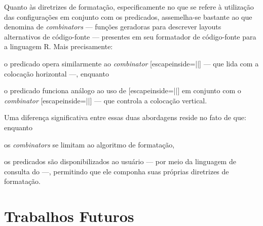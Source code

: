 \documentclass
  [11pt,a4paper,english,brazil,openright,sumario=tradicional,twoside]
  {abntex2}
\begin{document}
  Quanto às diretrizes de formatação, especificamente no que se refere à
  utilização das configurações em conjunto com os predicados, assemelha-se
  bastante ao que \textcite{yelland-2015-new} denomina de \textit{combinators}
  --- funções geradoras para descrever layouts alternativos de código-fonte ---
  presentes em seu formatador de código-fonte para a linguagem R. Mais
  precisamente:
  \begin{inparaenum}
    \item o predicado  opera similarmente ao
          \textit{combinator}
          \codesnippetinline{|$\leftrightarrow$|}[escapeinside=||] --- que lida
          com a colocação horizontal ---, enquanto
    \item o predicado  funciona análogo ao uso de
          \codesnippetinline{|$\leftrightarrow$|}[escapeinside=||] em conjunto
          com o \textit{combinator}
          \codesnippetinline{|$\updownarrow$|}[escapeinside=||] --- que
          controla a colocação vertical.
  \end{inparaenum}
  Uma diferença significativa entre essas duas abordagens reside no fato de
  que: enquanto
  \begin{inparaenum}
    \item os \textit{combinators} se limitam ao algoritmo de formatação,
    \item os predicados são disponibilizados ao usuário --- por meio da
          linguagem de consulta do \treesitter{} ---, permitindo que ele
          componha suas próprias diretrizes de formatação.
  \end{inparaenum}


  \section{Trabalhos Futuros}
\end{document}
